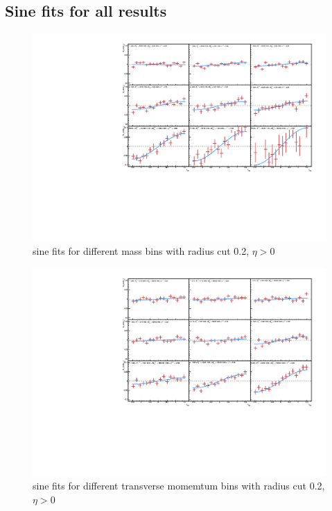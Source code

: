 \documentclass[letterpaper, abstract = on,listof=totoc, bibliography=totoc]{scrreprt}
\begin{document}
\begin{appendices}
\chapter{Sine fits for all results}

\begin{figure}
\begin{center}
\includegraphics[width = 1\textwidth]{cone2Vm_hiEtaV2.pdf}
\caption[sine fits for different mass bins with radius cut 0.2]{sine fits for different mass bins with radius cut 0.2, $\eta > 0$}
\label{}
\end{center}
\end{figure}

\begin{figure}
\begin{center}
\includegraphics[width = 1\textwidth]{cone2Vpt_hiEtaV2.pdf}
\caption[sine fits for different transverse momemtum bins with radius cut 0.2]{sine fits for different transverse momemtum bins with radius cut 0.2, $\eta > 0$}
\label{}
\end{center}
\end{figure}


\end{appendices}
\end{document}
